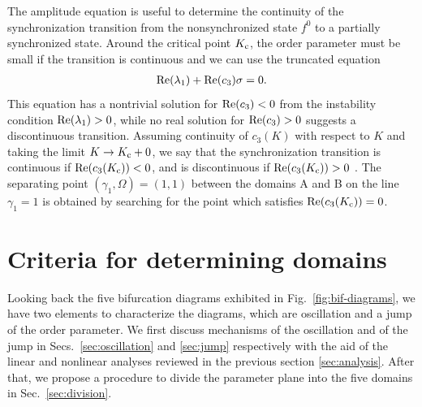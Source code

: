 The amplitude equation is useful to determine
the continuity of the synchronization transition
from the nonsynchronized state $f^{0}$ 
to a partially synchronized state.
Around the critical point $K_{\rm c}$,
the order parameter must be small if the transition is continuous
and we can use the truncated equation
\begin{align}
  {\rm Re}(\lambda_{1}) + {\rm Re}(c_{3}) \sigma = 0.
\end{align}
  This equation has a nontrivial solution for ${\rm Re}(c_{3})<0$
  from the instability condition ${\rm Re}(\lambda_{1})>0$,
  while no real solution for ${\rm Re}(c_{3})>0$
  suggests a discontinuous transition.
Assuming continuity of $c_{3}(K)$ with respect to $K$
and taking the limit $K\to K_{\rm c}+0$, we say
that the synchronization transition is continuous
if ${\rm Re}(c_{3}(K_{\rm c}))<0$,
and is discontinuous if ${\rm Re}(c_{3}(K_{\rm c}))>0$ \cite{barre2016}.
  The separating point $(\gamma_{1},\Omega)=(1,1)$
between the domains A and B 
on the line $\gamma_{1}=1$
is obtained by searching for
the point which satisfies ${\rm Re}(c_{3}(K_{\rm c}))=0$.





\section{Criteria for determining domains}
\label{sec:criteria}

Looking back the five bifurcation diagrams exhibited in Fig.~\ref{fig:bif-diagrams},
we have two elements to characterize the diagrams,
which are oscillation and a jump of the order parameter.
We first discuss mechanisms of the oscillation and of the jump
in Secs.~\ref{sec:oscillation} and \ref{sec:jump} respectively
with the aid of the linear and nonlinear analyses 
reviewed in the previous section \ref{sec:analysis}.
After that, we propose a procedure to divide the parameter plane
into the five domains in Sec.~\ref{sec:division}.


